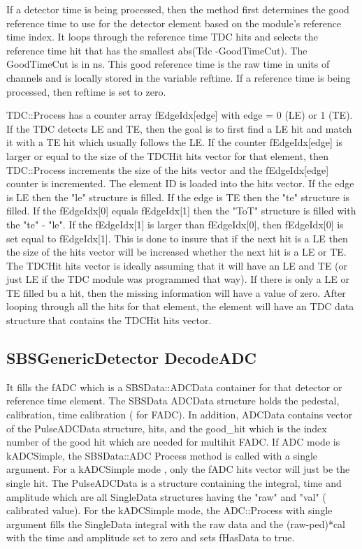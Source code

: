 \documentclass[11pt]{article}
\begin{document}
If a detector time is being processed, then the method first determines the good reference
time to use for the detector element based on the module's reference time index. 
It loops through the reference time TDC hits and selects the reference time hit that has
the smallest abs(Tdc -GoodTimeCut). The GoodTimeCut is in ns. This good reference time is the raw time
in units of channels and is locally stored in the variable reftime. If a reference time is being processed,
then reftime is set to zero.

TDC::Process has a counter array fEdgeIdx[edge] with edge = 0 (LE) or 1 (TE).
If the TDC detects LE and TE, then the goal is to first find a LE hit and match it with a TE hit which usually
follows the LE.
If the counter fEdgeIdx[edge] is larger or equal to the size of the TDCHit hits vector for that element,
then TDC::Process increments the size of the hits vector and the fEdgeIdx[edge] counter is incremented.
The element ID is loaded into the hits vector.
 If the edge is LE then the "le" structure is filled. If the edge is TE then the "te" structure is filled.
 If the fEdgeIdx[0] equals fEdgeIdx[1] then the "ToT" structure is filled with the "te" - "le".
  If the fEdgeIdx[1] is larger than fEdgeIdx[0], then fEdgeIdx[0] is set equal to fEdgeIdx[1]. This
  is done to insure that if the next hit is a LE then the size of the hits vector will be increased
  whether the next hit is a LE or TE. 
  The TDCHit hits vector is ideally assuming that it will have an LE and TE (or just LE if the TDC module
  was programmed that way). If there is only a LE or TE filled bu a hit, then the missing information will have
  a value of zero. After looping through all the hits for that element, the element will have an TDC data structure
  that contains the TDCHit hits vector. 
  

    




\subsection{SBSGenericDetector DecodeADC}
It  fills the fADC which is a SBSData::ADCData container for that detector or reference time element. 
The SBSData ADCData structure holds the pedestal, calibration, time calibration ( for FADC).
 In addition, ADCData contains vector of the PulseADCData structure, hits, and
 the good\_hit which is the index number of the good
hit which are needed for multihit FADC. If ADC mode is kADCSimple, the SBSData::ADC Process method is called with a single argument.
 For a kADCSimple mode , only the fADC hits vector will just
be the single hit. The PulseADCData is a structure containing the integral, time and amplitude
which are all SingleData structures having the "raw" and "val" ( calibrated value).
For the kADCSimple mode, the ADC::Process with single argument fills the SingleData integral with the raw data 
and the (raw-ped)*cal with the time and amplitude set to zero and sets fHasData to true.
\end{document}
